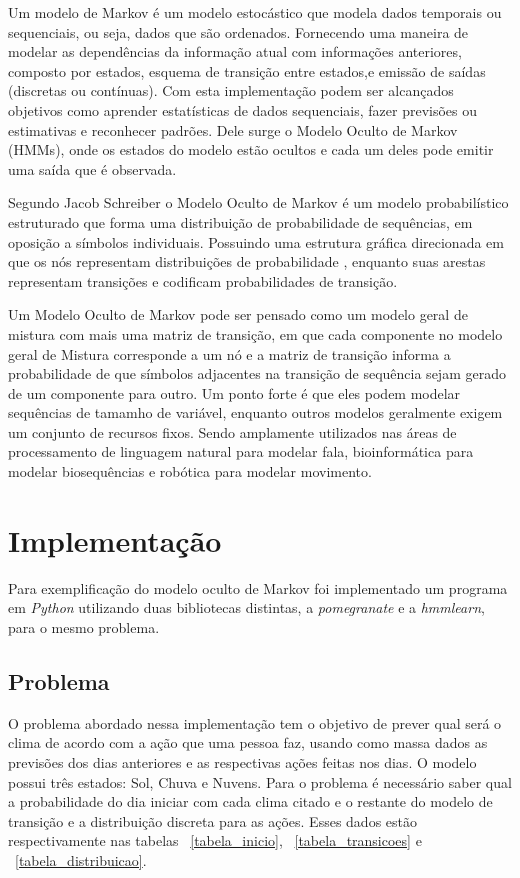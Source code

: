 \documentclass{article}
\begin{document}
Um modelo de Markov é um modelo estocástico que modela dados temporais ou sequenciais, ou seja, dados que são ordenados. Fornecendo uma maneira de modelar as dependências da informação atual com informações anteriores, composto por estados, esquema de transição entre estados,e emissão de saídas (discretas ou contínuas). Com esta implementação podem ser alcançados objetivos como aprender estatísticas de dados sequenciais, fazer previsões ou estimativas e reconhecer padrões. Dele surge o Modelo Oculto de Markov (HMMs), onde os estados do modelo estão ocultos e cada um deles pode emitir uma saída que é observada.

Segundo Jacob Schreiber o Modelo Oculto de Markov é um modelo probabilístico estruturado que forma uma distribuição de probabilidade de sequências, em oposição a símbolos individuais. Possuindo uma estrutura gráfica direcionada em que os nós representam distribuições de probabilidade , enquanto suas arestas representam transições e codificam probabilidades de transição. 

Um Modelo Oculto de Markov pode ser pensado como um modelo geral de mistura com mais uma matriz de transição, em que cada componente no modelo geral de Mistura corresponde a um nó  e a matriz de transição informa a probabilidade de que símbolos adjacentes na transição de sequência sejam gerado de um componente para outro. Um ponto forte é que eles podem modelar sequências de tamamho de variável, enquanto outros modelos geralmente exigem um conjunto de recursos fixos. Sendo amplamente utilizados nas áreas de processamento de linguagem natural para modelar fala, bioinformática para modelar biosequências e robótica para modelar movimento.

\section{Implementação}
Para exemplificação do modelo oculto de Markov foi implementado um programa em \emph{Python} utilizando duas bibliotecas distintas, a \emph{pomegranate} e a \emph{hmmlearn}, para o mesmo problema. 

\subsection{Problema}
O problema abordado nessa implementação tem o objetivo de prever qual será o clima de acordo com a ação que uma pessoa faz, usando como massa dados as previsões dos dias anteriores e as respectivas ações feitas nos dias.
O modelo possui três estados: Sol, Chuva e Nuvens. Para o problema é necessário saber qual a probabilidade do dia iniciar com cada clima citado e o restante do modelo de transição e a distribuição discreta para as ações. Esses dados estão respectivamente nas tabelas ~\ref{tabela_inicio}, ~\ref{tabela_transicoes} e ~\ref{tabela_distribuicao}.
\end{document}
